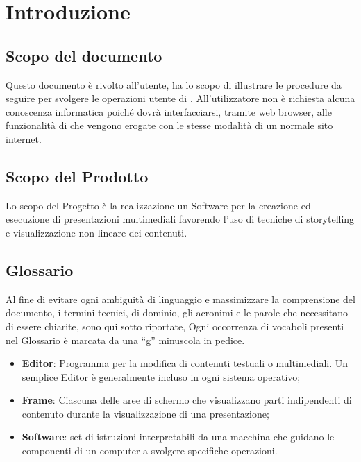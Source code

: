 \section{Introduzione}
\subsection{Scopo del documento}
Questo documento è rivolto all’utente, ha lo scopo di illustrare le procedure da seguire per svolgere le operazioni utente di \premi . All'utilizzatore non è richiesta alcuna conoscenza informatica poiché dovrà interfacciarsi, tramite web browser, alle funzionalità di \premi che vengono erogate con le stesse modalità di un normale sito internet.
\subsection{Scopo del Prodotto}
Lo scopo del Progetto è la realizzazione un Software per la creazione ed esecuzione di presentazioni multimediali favorendo l’uso di tecniche di storytelling e visualizzazione non lineare dei contenuti.
\subsection{Glossario}
Al fine di evitare ogni ambiguità di linguaggio e massimizzare la comprensione del documento, i termini tecnici, di dominio, gli acronimi e le parole che necessitano di essere chiarite, sono qui sotto riportate, Ogni occorrenza di vocaboli presenti nel Glossario è marcata da una “g” minuscola in pedice.
\begin{itemize}
\item \textbf{Editor}: Programma per la modifica di contenuti testuali o multimediali. Un semplice Editor è generalmente incluso in ogni sistema operativo;
\item \textbf{Frame}: Ciascuna delle aree di schermo che visualizzano parti indipendenti di contenuto durante la visualizzazione di una presentazione;
\item \textbf{Software}: set di istruzioni interpretabili da una macchina che guidano le componenti di un computer a svolgere specifiche operazioni.

\end{itemize}




